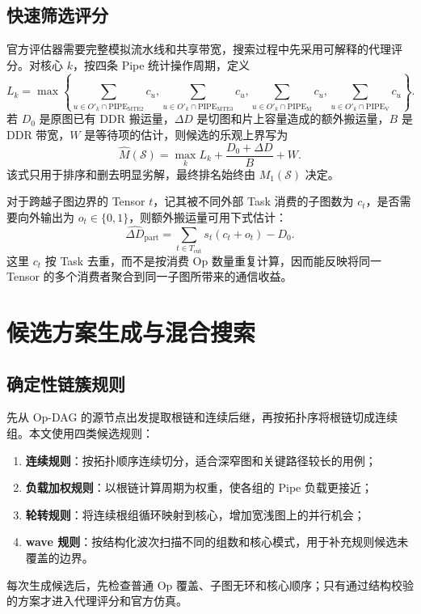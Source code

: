 \subsection{快速筛选评分}

官方评估器需要完整模拟流水线和共享带宽，搜索过程中先采用可解释的代理评分。对核心 $k$，按四条 Pipe 统计操作周期，定义
\begin{equation}
L_k=\max\left\{
\sum_{u\in O'_k\cap\mathrm{PIPE}_{\mathrm{MTE2}}}c_u,
\sum_{u\in O'_k\cap\mathrm{PIPE}_{\mathrm{MTE3}}}c_u,
\sum_{u\in O'_k\cap\mathrm{PIPE}_{\mathrm{M}}}c_u,
\sum_{u\in O'_k\cap\mathrm{PIPE}_{\mathrm{V}}}c_u
\right\}.
\end{equation}
若 $D_0$ 是原图已有 DDR 搬运量，$\Delta D$ 是切图和片上容量造成的额外搬运量，$B$ 是 DDR 带宽，$W$ 是等待项的估计，则候选的乐观上界写为
\begin{equation}
\widehat M(\mathcal S)=\max_k L_k+\frac{D_0+\Delta D}{B}+W.
\end{equation}
该式只用于排序和删去明显劣解，最终排名始终由 $M_1(\mathcal S)$ 决定。

对于跨越子图边界的 Tensor $t$，记其被不同外部 Task 消费的子图数为 $c_t$，是否需要向外输出为 $o_t\in\{0,1\}$，则额外搬运量可用下式估计：
\begin{equation}
\widehat{\Delta D}_{\mathrm{part}}=
\sum_{t\in T_{\mathrm{cut}}}s_t(c_t+o_t)-D_0.
\end{equation}
这里 $c_t$ 按 Task 去重，而不是按消费 Op 数量重复计算，因而能反映将同一 Tensor 的多个消费者聚合到同一子图所带来的通信收益。

\section{候选方案生成与混合搜索}

\subsection{确定性链簇规则}

先从 Op-DAG 的源节点出发提取根链和连续后继，再按拓扑序将根链切成连续组。本文使用四类候选规则：
\begin{enumerate}
  \item \textbf{连续规则}：按拓扑顺序连续切分，适合深窄图和关键路径较长的用例；
  \item \textbf{负载加权规则}：以根链计算周期为权重，使各组的 Pipe 负载更接近；
  \item \textbf{轮转规则}：将连续根组循环映射到核心，增加宽浅图上的并行机会；
  \item \textbf{wave 规则}：按结构化波次扫描不同的组数和核心模式，用于补充规则候选未覆盖的边界。
\end{enumerate}
每次生成候选后，先检查普通 Op 覆盖、子图无环和核心顺序；只有通过结构校验的方案才进入代理评分和官方仿真。

